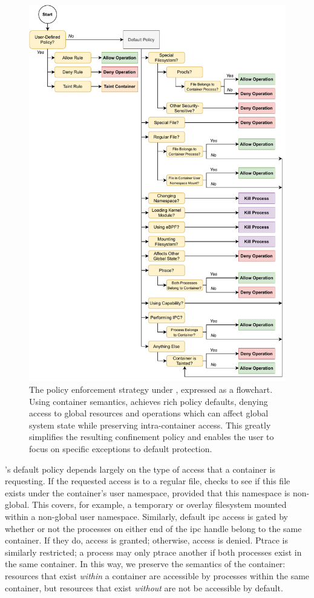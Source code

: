 \begin{figure}[p]
  \centering
  \includegraphics[width=0.75\linewidth]{figs/bpfcontain/enforcement.pdf}
  \caption[The policy enforcement strategy under \bpfcontain{}]{
    The policy enforcement strategy under \bpfcontain{}, expressed as a flowchart. Using
    container semantics, \bpfcontain{} achieves rich policy defaults, denying access to
    global resources and operations which can affect global system state while preserving
    intra-container access. This greatly simplifies the resulting confinement policy and
    enables the user to focus on specific exceptions to default protection.
  }%
  \label{fig:bpfcontain-enforcement}
\end{figure}

\bpfcontain{}'s default policy depends largely on the type of access that a container is
requesting. If the requested access is to a regular file, \bpfcontain{} checks to see if
this file exists under the container's user namespace, provided that this namespace is
non-global. This covers, for example, a temporary or overlay filesystem mounted within
a non-global user namespace.  Similarly, default \gls{ipc} access is gated by whether or
not the processes on either end of the \gls{ipc} handle belong to the same container. If
they do, access is granted; otherwise, access is denied. Ptrace is similarly restricted;
a process may only ptrace another if both processes exist in the same container. In this
way, we preserve the semantics of the container: resources that exist \textit{within}
a container are accessible by processes within the same container, but resources
that exist \textit{without} are not be accessible by default.

